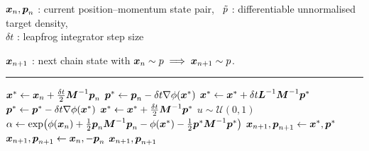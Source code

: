 \begin{algorithmic}
\small
    \Require
    $\boldsymbol{x}_n,\boldsymbol{p}_n$ : current position--momentum state pair,~
    $\tilde{p}$ : differentiable unnormalised target density,\\
    $\delta t$ : leapfrog integrator step size
    \Ensure\raggedright
    $\boldsymbol{x}_{n+1}$ : next chain state with $\boldsymbol{x}_n \sim p \implies \boldsymbol{x}_{n+1} \sim p$.
\end{algorithmic}
\hrule
\small
\begin{algorithmic}[1]
  \State $\boldsymbol{x}^* \gets \boldsymbol{x}_n + \frac{\delta t}{2} \boldsymbol{M}^{-1}\boldsymbol{p}_n$
  \State $\boldsymbol{p}^* \gets \boldsymbol{p}_n - \delta t \nabla\phi(\boldsymbol{x}^*)$
    \State $\boldsymbol{x}^* \gets \boldsymbol{x}^* + \delta t \boldsymbol{L}^{-1}\boldsymbol{M}^{-1}\boldsymbol{p}^*$
    \State $\boldsymbol{p}^* \gets \boldsymbol{p}^* - \delta t \nabla\phi(\boldsymbol{x}^*)$
  \EndFor
  \State $\boldsymbol{x}^* \gets \boldsymbol{x}^* + \frac{\delta t}{2} \boldsymbol{M}^{-1}\boldsymbol{p}^*$
  \State $u \sim \mathcal{U}(0,1)$
  \State $\alpha \gets \exp\lpa\phi(\vct{x}_n) + \frac{1}{2}\vct{p}_n\mtx{M}^{-1}\vct{p}_n - \phi(\vct{x}^*) - \frac{1}{2}\vct{p}^*\mtx{M}^{-1}\vct{p}^*\rpa$
    \State $\boldsymbol{x}_{n+1}, \boldsymbol{p}_{n+1} \gets \boldsymbol{x}^*, \boldsymbol{p}^*$ 
  \Else
    \State $\boldsymbol{x}_{n+1}, \boldsymbol{p}_{n+1} \gets \boldsymbol{x}_{n}, -\boldsymbol{p}_n$ 
  \EndIf
  \State \Return $\boldsymbol{x}_{n+1}, \boldsymbol{p}_{n+1}$
\end{algorithmic}
